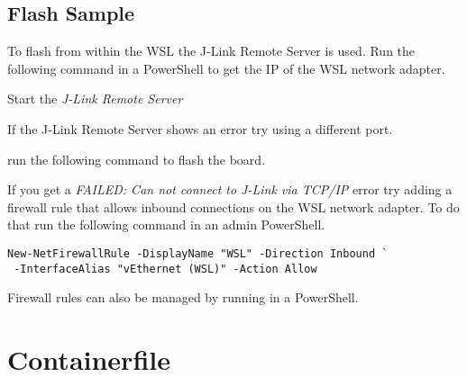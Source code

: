 \subsection{Flash Sample}

To flash from within the WSL the J-Link Remote Server is used. Run the following
command in a PowerShell to get the IP of the WSL network adapter.


Start the \emph{J-Link Remote Server}

\begin{infobox}
  If the J-Link Remote Server shows an error try using a different port.
\end{infobox}

run the following command to flash the board.


\begin{infobox}
  If you get a \emph{FAILED: Can not connect to J-Link via TCP/IP} error try
  adding a firewall rule that allows inbound connections on the WSL network
  adapter. To do that run the following command in an admin PowerShell.

  \begin{lstlisting}
New-NetFirewallRule -DisplayName "WSL" -Direction Inbound `
 -InterfaceAlias "vEthernet (WSL)" -Action Allow
  \end{lstlisting}

  Firewall rules can also be managed by running  in a PowerShell.
\end{infobox}

\newpage

\fancyfoot{}

\appendix

\section{Containerfile}\label{containerfile}




